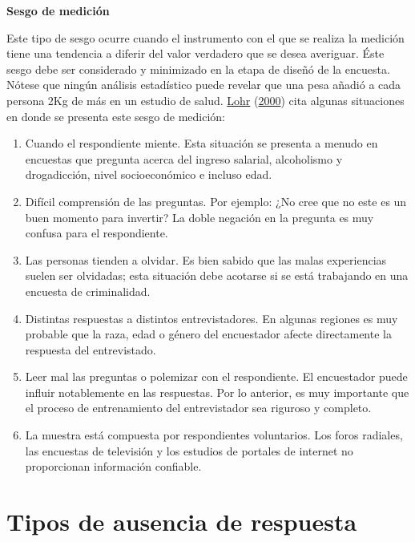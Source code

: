 \documentclass[
  12pt,
  spanish,
]{book}
\begin{document}
\textbf{Sesgo de medición}

Este tipo de sesgo ocurre cuando el instrumento con el que se realiza la medición tiene una tendencia a diferir del valor verdadero que se desea averiguar. Éste sesgo debe ser considerado y minimizado en la etapa de diseñó de la encuesta. Nótese que ningún análisis estadístico puede revelar que una pesa añadió a cada persona 2Kg de más en un estudio de salud. \protect\hyperlink{ref-Loh}{Lohr} (\protect\hyperlink{ref-Loh}{2000}) cita algunas situaciones en donde se presenta este sesgo de medición:

\begin{enumerate}
\item Cuando el respondiente miente. Esta situación se presenta a menudo en encuestas que pregunta acerca del ingreso salarial, alcoholismo y drogadicción, nivel socioeconómico e incluso edad.
\item Difícil comprensión de las preguntas. Por ejemplo: ¿No cree que no este es un buen momento para invertir? La doble negación en la pregunta es muy confusa para el respondiente.
\item Las personas tienden a olvidar. Es bien sabido que las malas experiencias suelen ser olvidadas; esta situación debe acotarse si se está trabajando en una encuesta de criminalidad.
\item Distintas respuestas a distintos entrevistadores. En algunas regiones es muy probable que la raza, edad o género del encuestador afecte directamente la respuesta del entrevistado.
\item Leer mal las preguntas o polemizar con el respondiente. El encuestador puede influir notablemente en las respuestas. Por lo anterior, es muy importante que el proceso de entrenamiento del entrevistador sea riguroso y completo.
\item La muestra está compuesta por respondientes voluntarios. Los foros radiales, las encuestas de televisión y los estudios de portales de internet no proporcionan información confiable.
\end{enumerate}

\hypertarget{tipos-de-ausencia-de-respuesta}{%
\section{Tipos de ausencia de respuesta}\label{tipos-de-ausencia-de-respuesta}}
\end{document}
